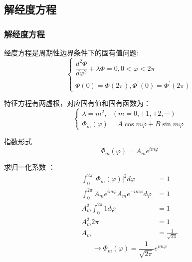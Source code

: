 \subsection{解经度方程}

\begin{frame}
	\frametitle{解经度方程}
	经度方程是周期性边界条件下的固有值问题:\\
	\[\begin{cases}
		\dfrac{d^{2} \Phi}{d \varphi^{2}}+\lambda \Phi=0,0<\varphi<2 \pi \\ 
		\Phi(0)=\Phi(2 \pi), \Phi^{\prime}(0)=\Phi^{\prime}(2 \pi)
	\end{cases}\]
	
	特征方程有两虚根，对应固有值和固有函数为：
	\[\begin{cases}
		\lambda=m^2, ~~~ (m=0,\pm 1,\pm 2,\cdots) \\ 
		\Phi_m (\varphi)=A\cos m\varphi+B\sin m\varphi
	\end{cases}\]
	
	指数形式
	\begin{equation*}
		\Phi_m (\varphi)=A_m e^{im\varphi}
	\end{equation*}	
\end{frame}	

\begin{frame}
	求归一化系数 ：
	\begin{equation*}
	\begin{split}
		\int_{0}^{2\pi}  |\Phi_m (\varphi)|^2 d\varphi &= 1 \\
		\int_{0}^{2\pi}  A_m e^{im\varphi} A_m e^{-im\varphi} d\varphi &= 1 \\
		A^2_m \int_{0}^{2\pi} 1 d\varphi &= 1 \\
		A^2_m 2\pi &= 1 \\
		A_m&=\frac{1}{\sqrt{2\pi}} 
	\end{split}
	\end{equation*}	
	\begin{equation*}
	\to 	\Phi_m (\varphi)=\frac{1}{\sqrt{2\pi}} e^{im\varphi}
	\end{equation*}	
\end{frame}	

